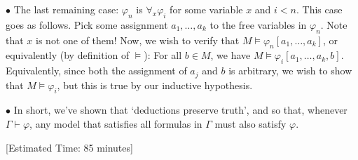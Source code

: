 \documentclass{article}
\newcommand\point[1]{\noindent \hspace{\labelsep} $\bullet$ #1 \smallskip}
\newcommand\timestamp[1]{\noindent \hspace{\labelsep} [Estimated Time: #1] \smallskip}
\begin{document}
\point{The last remaining case: $\varphi_n$ is $\forall_x \varphi_i$ for some variable $x$ and $i < n$. This case goes as follows. Pick some assignment $a_1, \dots, a_k$ to the free variables in $\varphi_n$. Note that $x$ is not one of them! Now, we wish to verify that $M \vDash \varphi_n[a_1, \dots, a_k]$, or equivalently (by definition of $\vDash$): For all $b \in M$, we have $M \vDash \varphi_i[a_1, \dots, a_k, b]$. Equivalently, since both the assignment of $a_j$ and $b$ is arbitrary, we wish to show that $M \vDash \varphi_i$, but this is true by our inductive hypothesis.}

\point{In short, we've shown that `deductions preserve truth', and so that, whenever $\Gamma \vdash \varphi$, any model that satisfies all formulas in $\Gamma$ must also satisfy $\varphi$.}

\timestamp{85 minutes}
\begin{comment}
\textbf{Note to the reader:} Ignore the following, it is only here in case it is useful later.

\section{Equality}

\point{Lemma (Equality): Let $\varphi$ be a formula, and let $\psi_1$ and $\psi_2$ be obtained from $\varphi$ by replacing (all free instances of) a fixed variable by the terms $t_1$ and $t_2$ respectively. Then, $\vdash (t_1 = t_2) \rightarrow (\psi_1 \leftrightarrow \psi_2)$.

This lemma is proven by inducting on the \emph{formula} structure of $\varphi$, to obtain and recursively construct a proof of the desired statement.}
\end{comment}
\end{document}

